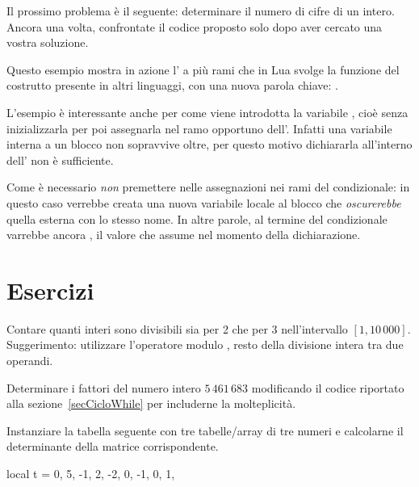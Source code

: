 Il prossimo problema è il seguente: determinare il numero di cifre di un
intero. Ancora una volta, confrontate il codice proposto solo dopo aver cercato
una vostra soluzione.

Questo esempio mostra in azione l' a più rami che in Lua svolge
la funzione del costrutto  presente in altri linguaggi, con una
nuova parola chiave: .

L'esempio è interessante anche per come viene introdotta la variabile
, cioè senza inizializzarla per poi assegnarla nel ramo opportuno
dell'. Infatti una variabile interna a un blocco non sopravvive oltre,
per questo motivo dichiararla all'interno dell' non è sufficiente.

Come è necessario \emph{non} premettere  nelle
assegnazioni nei rami del condizionale: in questo caso verrebbe creata una nuova
variabile locale al blocco che \emph{oscurerebbe} quella esterna con lo stesso
nome. In altre parole, al termine del condizionale  varrebbe ancora
, il valore che assume nel momento della dichiarazione.


\section{Esercizi}

\begin{Exercise}[label=cos-01]
Contare quanti interi sono divisibili sia per 2 che per 3 nell'intervallo \( [1,
10\,000]\). Suggerimento: utilizzare l'operatore modulo \key{\%}, resto della
divisione intera tra due operandi.
\end{Exercise}

\begin{Exercise}[label=cos-02]
Determinare i fattori del numero intero \(5\,461\,683\) modificando il codice
riportato alla sezione~\ref{secCicloWhile} per includerne la molteplicità.
\end{Exercise}

\begin{Exercise}[label=cos-03]
Instanziare la tabella seguente con tre tabelle/array di tre numeri e calcolarne
il determinante della matrice corrispondente.
\begin{lines}
local t = {
    { 0,  5, -1},
    { 2, -2,  0},
    {-1,  0,  1},
}
\end{lines}
\end{Exercise}

